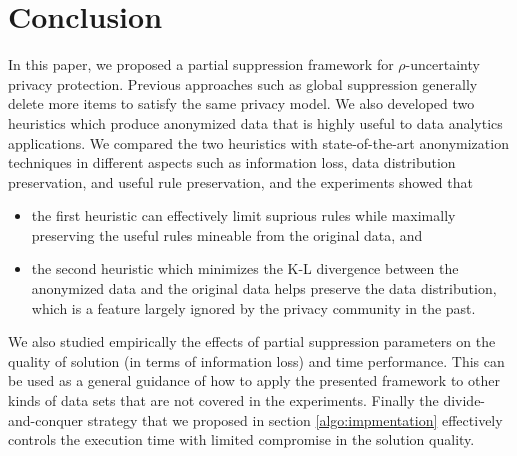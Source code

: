 \section{Conclusion}
\label{sec:conclude}
In this paper, we proposed a partial suppression framework for
$\rho$-uncertainty privacy protection.  Previous approaches such as
global suppression generally delete more items to satisfy the same
privacy model.  We also developed two heuristics which produce anonymized
data that is highly useful to data analytics applications.
We compared the two heuristics with state-of-the-art anonymization techniques
in different aspects such as information loss, data distribution preservation,
and useful rule preservation, and the experiments showed that
\begin{itemize}
\item the first heuristic can effectively limit suprious rules while
maximally preserving the useful rules mineable from the original data, and
\item the second heuristic which minimizes the K-L divergence between the
anonymized data and the original data helps preserve the data distribution,
which is a feature largely ignored by the privacy community in the past.
\end{itemize}
We also studied empirically the effects of partial suppression parameters
on the quality of solution (in terms of information loss) and time performance.
This can be used as a general guidance of how to apply the presented framework
to other kinds of data sets that are not covered in the experiments.
Finally the divide-and-conquer strategy that we proposed in section \ref{algo:impmentation}
effectively controls the execution time with limited compromise in the solution quality.
